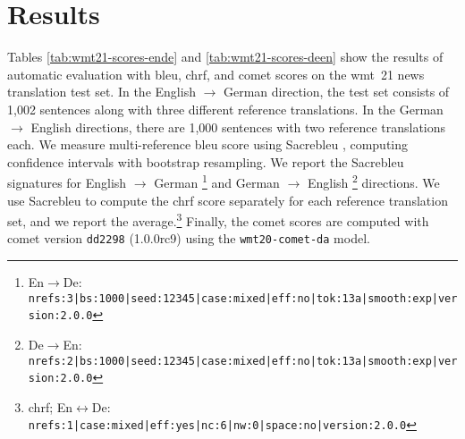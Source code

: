 \section{Results}%
\label{sec:results}

Tables \ref{tab:wmt21-scores-ende} and \ref{tab:wmt21-scores-deen} show the
results of automatic evaluation with \acs{bleu}, \acs{chrf}, and \acs{comet}
scores on the \acs{wmt}~21 news translation test set. In the English
$\rightarrow$ German direction, the test set consists of 1,002 sentences along
with three different reference translations. In the German $\rightarrow$
English directions, there are 1,000 sentences with two reference translations
each. We measure multi-reference \acs{bleu} score using Sacrebleu
\citep{post-2018-call}, computing confidence intervals with bootstrap
resampling. We report the Sacrebleu signatures for English $\rightarrow$
German%
\footnote{En$\rightarrow$De: {\scriptsize
    \texttt{nrefs:3|bs:1000|seed:12345|case:mixed|eff:no|tok:13a|smooth:exp|version:2.0.0}}}
and German $\rightarrow$ English%
\footnote{De$\rightarrow$En: {\scriptsize
    \texttt{nrefs:2|bs:1000|seed:12345|case:mixed|eff:no|tok:13a|smooth:exp|version:2.0.0}}}
directions. We use Sacrebleu to compute the \acs{chrf} score separately for
each reference translation set, and we report the average.\footnote{\acs{chrf};
  En$\leftrightarrow$De: {\scriptsize
    \texttt{nrefs:1|case:mixed|eff:yes|nc:6|nw:0|space:no|version:2.0.0}}}
Finally, the \acs{comet} scores are computed with \acs{comet} version
\texttt{dd2298} (1.0.0rc9) using the \texttt{wmt20-comet-da} model.

